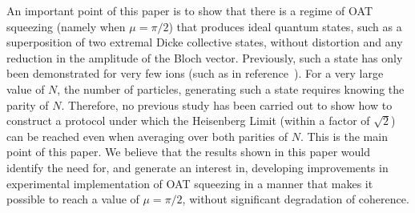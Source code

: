 \documentclass[aps,pra,letterpaper,superscriptaddress,showpacs,amsmath,floats,twocolumn]{revtex4-1}
\begin{document}
An important point of this paper is to show that there is a regime of OAT squeezing (namely when $\mu = \pi/2$) that produces ideal quantum states, such as a superposition of two extremal Dicke collective states, without distortion and any reduction in the amplitude of the Bloch vector. Previously, such a state has only been demonstrated for very few ions (such as in reference~\cite{Blatt}). For a very large value of $N$, the number of particles, generating such a state requires knowing the parity of $N$. Therefore, no previous study has been carried out to show how to construct a protocol under which the Heisenberg Limit (within a factor of $\sqrt 2$) can be reached even when averaging over both parities of $N$. This is the main point of this paper. We believe that the results shown in this paper would identify the need for, and generate an interest in, developing improvements in experimental implementation of OAT squeezing in a manner that makes it possible to reach a value of $\mu = \pi/2$, without significant degradation of coherence.  



\end{document}

